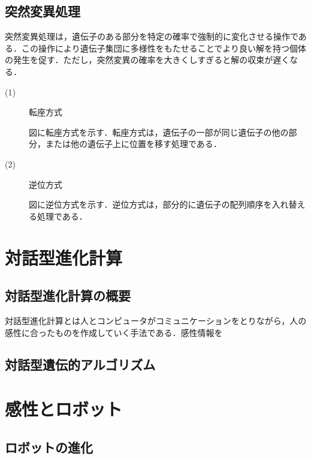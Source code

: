 \newpage


\subsection{突然変異処理}
\label{sec2.1.5}

突然変異処理は，遺伝子のある部分を特定の確率で強制的に変化させる操作である．この操作により遺伝子集団に多様性をもたせることでより良い解を持つ個体の発生を促す．ただし，突然変異の確率を大きくしすぎると解の収束が遅くなる．

\begin{description}

\item[ (1) ]転座方式

図に転座方式を示す．転座方式は，遺伝子の一部が同じ遺伝子の他の部分，または他の遺伝子上に位置を移す処理である．

\item[ (2) ]逆位方式


図に逆位方式を示す．逆位方式は，部分的に遺伝子の配列順序を入れ替える処理である．


\end{description}


\newpage

\section{対話型進化計算}
\label{sec2.2}

\subsection{対話型進化計算の概要}
\label{sec2.2.1}

対話型進化計算とは人とコンピュータがコミュニケーションをとりながら，人の感性に合ったものを作成していく手法である．感性情報を

    
\subsection{対話型遺伝的アルゴリズム}
\label{sec2.2.2}

\newpage

\section{感性とロボット}
\label{sec2.3}

\subsection{ロボットの進化}
\label{sec2.3.1}

